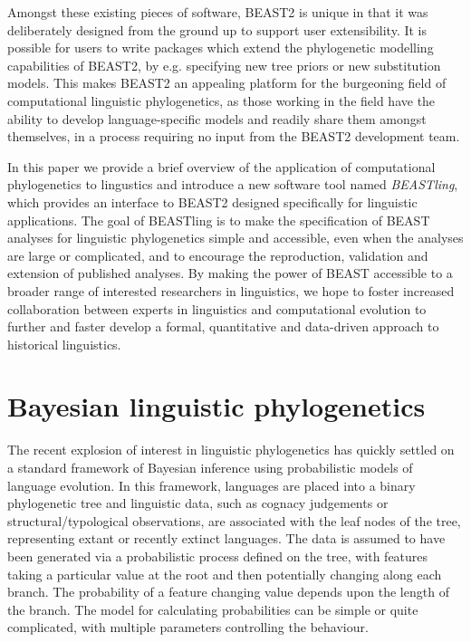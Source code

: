 \documentclass[10pt,a4paper]{article}
\begin{document}
Amongst these existing pieces of software, BEAST2 is unique in that it was deliberately designed from the ground up to support user extensibility.  It is possible for users to write packages which extend the phylogenetic modelling capabilities of BEAST2, by e.g. specifying new tree priors or new substitution models.  This makes BEAST2 an appealing platform for the burgeoning field of computational linguistic phylogenetics, as those working in the field have the ability to develop language-specific models and readily share them amongst themselves, in a process requiring no input from the BEAST2 development team.

In this paper we provide a brief overview of the application of computational phylogenetics to lingustics and introduce a new software tool named \mbox{\emph{BEASTling}}, which provides an interface to BEAST2 designed specifically for linguistic applications.  The goal of BEASTling is to make the specification of BEAST analyses for linguistic phylogenetics simple and accessible, even when the analyses are large or complicated, and to encourage the reproduction, validation and extension of published analyses.  By making the power of BEAST accessible to a broader range of interested researchers in linguistics, we hope to foster increased collaboration between experts in linguistics and computational evolution to further and faster develop a formal, quantitative and data-driven approach to historical linguistics.

\section{Bayesian linguistic phylogenetics}

The recent explosion of interest in linguistic phylogenetics has quickly settled on a standard framework of Bayesian inference using probabilistic models of language evolution.  In this framework, languages are placed into a binary phylogenetic tree and linguistic data, such as cognacy judgements or structural/typological observations, are associated with the leaf nodes of the tree, representing extant or recently extinct languages. The data is assumed to have been generated via a probabilistic process defined on the tree, with features taking a particular value at the root and then potentially changing along each branch.  The probability of a feature changing value depends upon the length of the branch. The model for calculating probabilities can be simple or quite complicated, with multiple parameters controlling the behaviour.
\end{document}
